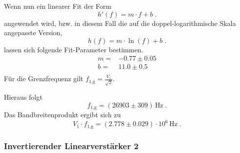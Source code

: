 Wenn nun ein linearer Fit der Form 
\begin{equation*}
    h'(f)=m\cdot f+b\; .
\end{equation*}
angewendet wird, bzw. in diesem Fall die auf die doppel-logarithmische Skala angepasste Version, 
\begin{equation*}
    h(f)= m \cdot \ln\left({f}\right) + b\; .
\end{equation*}
lassen sich folgende Fit-Parameter bestimmen.
\begin{align*}
    m=&-0.77\pm 0.05 \\
    b=& 11.0\pm 0.5\\
\end{align*}
Für die Grenzfrequenz gilt $f_{1\text{,g}}=\frac{V_1}{\sqrt{2}}$. 

Hieraus folgt
\begin{equation*}
    f_{1\text{,g}}= (26903 \pm 309 )\, \unit{\hertz}\; .
\end{equation*}
Das Bandbreitenprodukt ergibt sich zu 
\begin{equation*}
    V_1\cdot f_{1\text{,g}}=(2.778\pm 0.029)\cdot 10^{6}\, \unit{\hertz}\;.
\end{equation*}

\subsubsection{Invertierender Linearverstärker 2}
\label{sec:InvertierenderLinearverstärker2}

